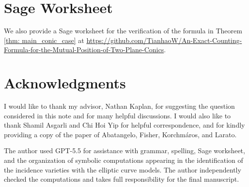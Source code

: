 \documentclass[11pt]{article}
\theoremstyle{definition}
\theoremstyle{definition}
\begin{document}
\section{Sage Worksheet}
We also provide a Sage worksheet for the verification of the formula in Theorem \ref{thm: main_conic_case} at \url{https://github.com/TianhaoW/An-Exact-Counting-Formula-for-the-Mutual-Position-of-Two-Plane-Conics}. 

\section*{Acknowledgments}
I would like to thank my advisor, Nathan Kaplan, for suggesting the question considered in this note and for many helpful discussions. I would also like to thank Shamil Asgarli and Chi Hoi Yip for helpful correspondence, and for kindly providing a copy of the paper of Abatangelo, Fisher, Korchmáros, and Larato.

The author used GPT-5.5 for assistance with grammar, spelling, Sage worksheet, and the organization of symbolic computations appearing in the identification of the incidence varieties with the elliptic curve models. The author independently checked the computations and takes full responsibility for the final manuscript.

\newpage
\printbibliography
\end{document}
